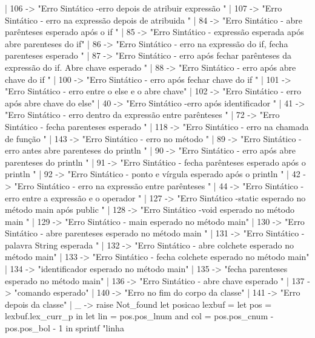 \documentclass[12pt,a4paper,twoside]{report}
\begin{document}
\begin{terminal}
    | 106 ->
        "Erro Sintático -erro depois de atribuir expressão \n"
    | 107 ->
        "Erro Sintático - erro na expressão depois de atribuida \n"
    | 84 ->
        "Erro Sintático - abre parênteses esperado após o if \n"
    | 85 ->
        "Erro Sintático - expressão esperada após abre parenteses do if\n"
    | 86 ->
        "Erro Sintático - erro na expressão do if, fecha parenteses esperado \n"
    | 87 ->
        "Erro Sintático - erro após fechar parênteses da expressão do if. Abre chave esperado \n"
    | 88 ->
        "Erro Sintático - erro após abre chave do if \n"
    | 100 ->
        "Erro Sintático - erro após fechar chave do if \n"
    | 101 ->
        "Erro Sintático - erro entre o else e o abre chave\n"
    | 102 ->
        "Erro Sintático - erro após abre chave do else\n"
    | 40 ->
        "Erro Sintático -erro após identificador \n"
    | 41 ->
        "Erro Sintático - erro dentro da expressão entre parênteses \n"
    | 72 ->
        "Erro Sintático - fecha parenteses esperado \n"
    | 118 ->
        "Erro Sintático - erro na chamada de função \n"
    | 143 ->
        "Erro Sintático - erro no método \n"
    | 89 ->
        "Erro Sintático - erro antes abre parenteses do println \n"
    | 90 ->
        "Erro Sintático - erro após abre parenteses do println \n"
    | 91 ->
        "Erro Sintático - fecha parênteses  esperado após o println  \n"
    | 92 ->
        "Erro Sintático - ponto e vírgula esperado após o println \n"
    | 42 ->
        "Erro Sintático - erro na expressão entre parênteses \n"
    | 44 ->
        "Erro Sintático - erro entre a expressão e o operador \n"
    | 127 ->
        "Erro Sintático -static esperado no método main após public \n"
    | 128 ->
        "Erro Sintático -void esperado no método main \n"
    | 129 ->
        "Erro Sintático - main esperado no método main\n"
    | 130 ->
        "Erro Sintático - abre parenteses esperado no método main \n"
    | 131 ->
        "Erro Sintático - palavra String esperada \n"
    | 132 ->
        "Erro Sintático - abre colchete esperado no método main\n"
    | 133 ->
        "Erro Sintático - fecha colchete esperado no método main\n"
    | 134 ->
        "identificador esperado no método main"
    | 135 ->
        "fecha parenteses esperado no método main"
    | 136 ->
        "Erro Sintático - abre chave esperado \n"
    | 137 ->
        "comando esperado"
    | 140 ->
        "Erro no fim do corpo da classe\n"
    | 141 ->
        "Erro depois da classe\n"
    | _ ->
        raise Not_found
let posicao lexbuf =
    let pos = lexbuf.lex_curr_p in
    let lin = pos.pos_lnum
    and col = pos.pos_cnum - pos.pos_bol - 1 in
    sprintf "linha %


\end{terminal}
\end{document}
